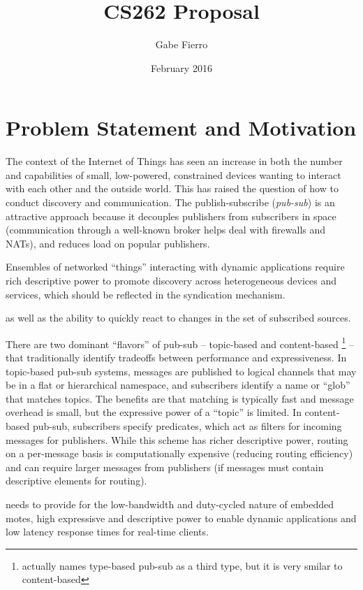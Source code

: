 \documentclass{article}
\title{CS262 Proposal}
\author{Gabe Fierro}
\date{February 2016}
\begin{document}
\maketitle

\section{Problem Statement and Motivation}

The context of the Internet of Things has seen an increase in both the number
and capabilities of small, low-powered, constrained devices wanting to interact
with each other and the outside world.  This has raised the question of how to
conduct discovery and communication. The publish-subscribe (\emph{pub-sub}) is
an attractive approach because it decouples publishers from subscribers in
space (communication through a well-known broker helps deal with firewalls and
NATs), and reduces load on popular publishers.

Ensembles of networked ``things'' interacting with dynamic applications require
rich descriptive power to promote discovery across heterogeneous devices and
services, which should be reflected in the syndication mechanism. 

as well as the ability to quickly react to changes in the set of
subscribed sources.

There are two dominant ``flavors'' of pub-sub -- topic-based and content-based
\footnote{\cite{eugster2003many} actually names type-based pub-sub as a third
type, but it is very smilar to content-based} -- that traditionally identify
tradeoffs between performance and expressiveness. In topic-based pub-sub
systems, messages are published to logical channels that may be in a flat or
hierarchical namespace, and subscribers identify a name or ``glob'' that
matches topics. The benefits are that matching is typically fast and message
overhead is small, but the expressive power of a ``topic'' is limited.  In
content-based pub-sub, subscribers specify predicates, which act as filters for
incoming messages for publishers. While this scheme has richer descriptive
power, routing on a per-message basis is computationally expensive (reducing
routing efficiency) and can require larger messages from publishers (if
messages must contain descriptive elements for routing).


needs to provide for the low-bandwidth and duty-cycled nature of embedded motes,
high expressisve and descriptive power to enable dynamic applications and low latency
response times for real-time clients.
\end{document}
